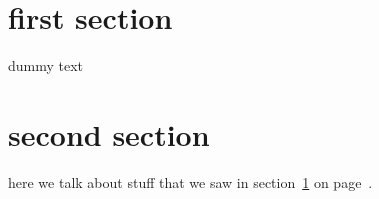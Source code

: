 \documentclass{article}
\begin{document}
\section{first section}
\label{sec:first-section}

dummy text

\clearpage

\section{second section}
\label{sec:second-section}

here we  talk about  stuff that we  saw in  section~\ref{sec:first-section} on
page~\pageref{sec:first-section}.
\end{document}
